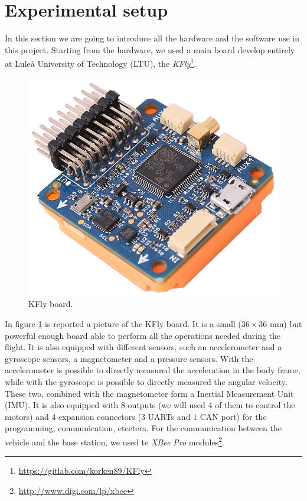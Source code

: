 \section{Experimental setup}

In this section we are going to introduce all the hardware and the software use in this project. Starting from the hardware, we used a main board develop entirely at Lule\r{a} University of Technology (LTU), the \textit{KFly}\footnote{\url{https://gitlab.com/korken89/KFly}}. 

\begin{figure}[h] 
	\centering
   	\includegraphics[scale = 0.4]{./images/KFly.png}
   	\caption{KFly board.}
   	\label{fig:KFly}
\end{figure} 

\noindent In figure \ref{fig:KFly} is reported a picture of the KFly board. It is a small ($36\times 36$ mm) but powerful enough board able to perform all the operations needed during the flight. It is also equipped with different sensors, such an accelerometer and a gyroscope sensors, a magnetometer and a pressure sensors. With the accelerometer is possible to directly measured the acceleration in the body frame, while with the gyroscope is possible to directly measured the angular velocity. These two, combined with the magnetometer form a Inertial Measurement Unit (IMU). It is also equipped with 8 outputs (we will used 4 of them to control the motors) and 4 expansion connectors (3 UARTs and 1 CAN port) for the programming, communication, etcetera. For the communication between the vehicle and the base station, we used te \textit{XBee Pro} modules\footnote{\url{http://www.digi.com/lp/xbee}}.

